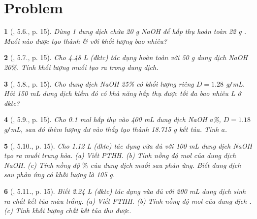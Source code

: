 \documentclass{article}
\newtheorem{baitoan}{}
\begin{document}

\section{Problem}

\begin{baitoan}[\cite{Truong_BTNC_Hoa_Hoc_9_2021}, 5.6., p. 15]
	Dùng 1 dung dịch chứa {\rm20 g NaOH} để hấp thụ hoàn toàn {\rm22 g }. Muối nào được tạo thành \& với khối lượng bao nhiêu?
\end{baitoan}

\begin{baitoan}[\cite{Truong_BTNC_Hoa_Hoc_9_2021}, 5.7., p. 15]
	Cho {\rm4.48 L } (đktc) tác dụng hoàn toàn với {\rm50 g} dung dịch {\rm NaOH 20\%}. Tính khối lượng muối tạo ra trong dung dịch.
\end{baitoan}

\begin{baitoan}[\cite{Truong_BTNC_Hoa_Hoc_9_2021}, 5.8., p. 15]
	Cho dung dịch {\rm NaOH 25\%} có khối lượng riêng $D = 1.28$ {\rm g{\tt/}mL}. Hỏi {\rm150 mL} dung dịch kiềm đó có khả năng hấp thụ được tối đa bao nhiêu {\rm L } ở đktc?
\end{baitoan}

\begin{baitoan}[\cite{Truong_BTNC_Hoa_Hoc_9_2021}, 5.9., p. 15]
	Cho {\rm0.1 mol } hấp thụ vào {\rm400 mL} dung dịch {\rm NaOH $a$\%}, $D = 1.18$ {\rm g{\tt/}mL}, sau đó thêm lượng dư {\rm{}} vào thấy tạo thành {\rm18.715 g} kết tủa. Tính $a$.
\end{baitoan}

\begin{baitoan}[\cite{Truong_BTNC_Hoa_Hoc_9_2021}, 5.10., p. 15]
	Cho {\rm1.12 L } (đktc) tác dụng vừa đủ với {\rm100 mL} dung dịch {\rm NaOH} tạo ra muối trung hòa. (a) Viết {\rm PTHH}. (b) Tính nồng độ mol của dung dịch {\rm NaOH}. (c) Tính nồng độ $\%$ của dung dịch muối sau phản ứng. Biết dung dịch sau phản ứng có khối lượng là {\rm105 g}.
\end{baitoan}

\begin{baitoan}[\cite{Truong_BTNC_Hoa_Hoc_9_2021}, 5.11., p. 15]
	Biết {\rm2.24 L } (đktc) tác dụng vừa đủ với {\rm200 mL} dung dịch {\rm{}} sinh ra chất kết tủa màu trắng. (a) Viết {\rm PTHH}. (b) Tính nồng độ mol của dung dịch {\rm{}}. (c) Tính khối lượng chất kết tủa thu được.
\end{baitoan}
\end{document}
